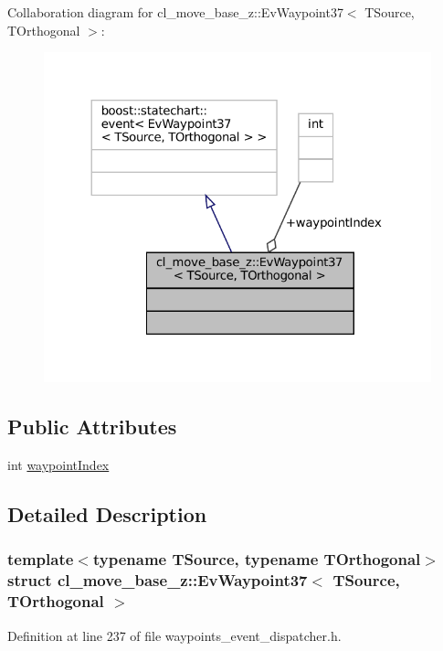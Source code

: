 Collaboration diagram for cl\+\_\+move\+\_\+base\+\_\+z\+:\+:Ev\+Waypoint37$<$ T\+Source, T\+Orthogonal $>$\+:
\nopagebreak
\begin{figure}[H]
\begin{center}
\leavevmode
\includegraphics[width=324pt]{structcl__move__base__z_1_1EvWaypoint37__coll__graph}
\end{center}
\end{figure}
\subsection*{Public Attributes}
\begin{DoxyCompactItemize}
\item 
int \hyperlink{structcl__move__base__z_1_1EvWaypoint37_a1cf0795fae70f80eab53907cf0d5b4ce}{waypoint\+Index}
\end{DoxyCompactItemize}


\subsection{Detailed Description}
\subsubsection*{template$<$typename T\+Source, typename T\+Orthogonal$>$\newline
struct cl\+\_\+move\+\_\+base\+\_\+z\+::\+Ev\+Waypoint37$<$ T\+Source, T\+Orthogonal $>$}



Definition at line 237 of file waypoints\+\_\+event\+\_\+dispatcher.\+h.



